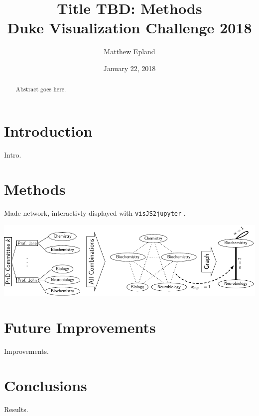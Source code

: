 \documentclass[notitlepage,aps,prd,nofootinbib]{revtex4-1}
\newcommand{\includedir}{../latex_files}
\begin{document}
\title{Title TBD: Methods\\Duke Visualization Challenge 2018}
\author{Matthew\,\,Epland}
\date{January 22, 2018}


\begin{abstract}
Abstract goes here.
\end{abstract}

\maketitle

\section{Introduction}
Intro.

\section{Methods}
Made network, interactivly displayed with \texttt{visJS2jupyter} \cite{visJS2jupyter}.

\includegraphics[width=\textwidth]{../poster/tikzout/vis_challenge_2018_poster-matthew_epland-figure0.pdf}

\section{Future Improvements}
Improvements.

\section{Conclusions}
Results.





\end{document}
